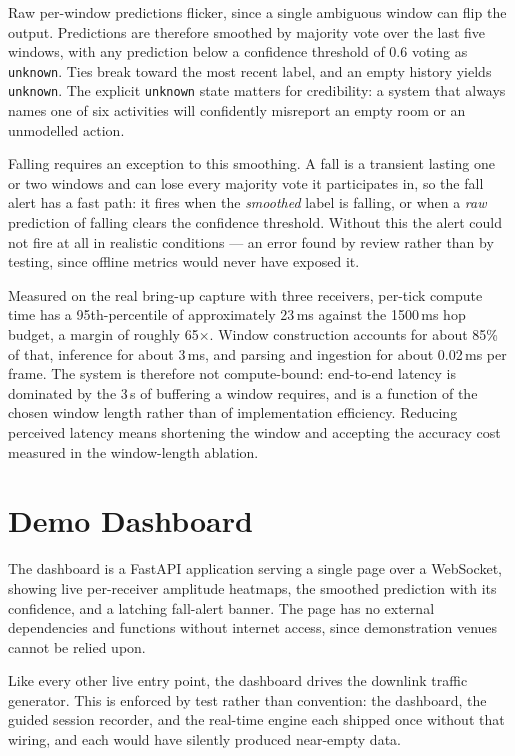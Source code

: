 Raw per-window predictions flicker, since a single ambiguous window can flip
the output. Predictions are therefore smoothed by majority vote over the last
five windows, with any prediction below a confidence threshold of 0.6 voting
as \texttt{unknown}. Ties break toward the most recent label, and an empty
history yields \texttt{unknown}. The explicit \texttt{unknown} state matters
for credibility: a system that always names one of six activities will
confidently misreport an empty room or an unmodelled action.

Falling requires an exception to this smoothing. A fall is a transient
lasting one or two windows and can lose every majority vote it participates
in, so the fall alert has a fast path: it fires when the \emph{smoothed}
label is falling, or when a \emph{raw} prediction of falling clears the
confidence threshold. Without this the alert could not fire at all in
realistic conditions --- an error found by review rather than by testing,
since offline metrics would never have exposed it.

Measured on the real bring-up capture with three receivers, per-tick compute
time has a 95th-percentile of approximately 23\,ms against the 1500\,ms hop
budget, a margin of roughly 65$\times$. Window construction accounts for
about 85\% of that, inference for about 3\,ms, and parsing and ingestion for
about 0.02\,ms per frame. The system is therefore not compute-bound:
end-to-end latency is dominated by the 3\,s of buffering a window requires,
and is a function of the chosen window length rather than of implementation
efficiency. Reducing perceived latency means shortening the window and
accepting the accuracy cost measured in the window-length ablation.


\section{Demo Dashboard}

The dashboard is a FastAPI application serving a single page over a
WebSocket, showing live per-receiver amplitude heatmaps, the smoothed
prediction with its confidence, and a latching fall-alert banner. The page
has no external dependencies and functions without internet access, since
demonstration venues cannot be relied upon.

Like every other live entry point, the dashboard drives the downlink traffic
generator. This is enforced by test rather than convention: the dashboard,
the guided session recorder, and the real-time engine each shipped once
without that wiring, and each would have silently produced near-empty data.

